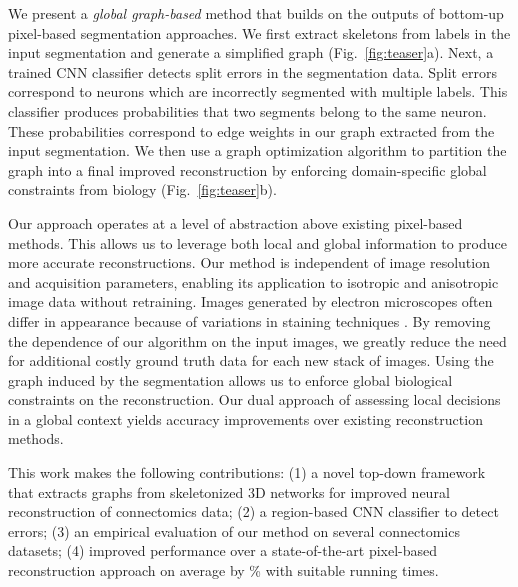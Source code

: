 We present a \textit{global graph-based} method that builds on the outputs of bottom-up pixel-based segmentation approaches. 
We first extract skeletons from labels in the input segmentation and generate a simplified graph (Fig.~\ref{fig:teaser}a). 
Next, a trained CNN classifier detects split errors in the segmentation data. 
Split errors correspond to neurons which are incorrectly segmented with multiple labels. 
This classifier produces probabilities that two segments belong to the same neuron.
These probabilities correspond to edge weights in our graph extracted from the input segmentation.
We then use a graph optimization algorithm to partition the graph into a final improved reconstruction by enforcing domain-specific global constraints from biology (Fig.~\ref{fig:teaser}b).

Our approach operates at a level of abstraction above existing pixel-based methods. 
This allows us to leverage both local and global information to produce more accurate reconstructions. 
Our method is independent of image resolution and acquisition parameters, enabling its application to isotropic and anisotropic image data without retraining.
Images generated by electron microscopes often differ in appearance because of variations in staining techniques \cite{briggman2012volume}.
By removing the dependence of our algorithm on the input images, we greatly reduce the need for additional costly ground truth data for each new stack of images.
Using the graph induced by the segmentation allows us to enforce global biological constraints on the reconstruction. 
Our dual approach of assessing local decisions in a global context yields accuracy improvements over existing reconstruction methods.

This work makes the following contributions: (1) a novel top-down framework that extracts graphs from skeletonized 3D networks for improved neural reconstruction of connectomics data; (2) a region-based CNN classifier to detect errors; (3) an empirical evaluation of our method on several connectomics datasets; (4) improved performance over a state-of-the-art pixel-based reconstruction approach on average by \% with suitable running times.
